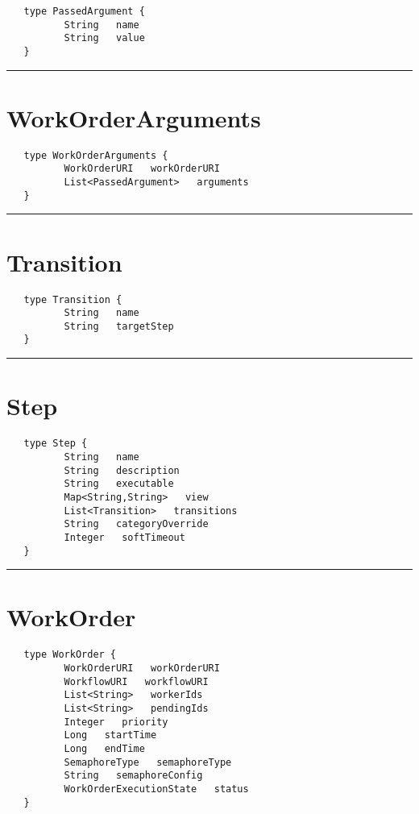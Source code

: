 \begin{verbatim}
   type PassedArgument {
          String   name
          String   value
   }
\end{verbatim}

\rule{12cm}{2pt}
\section{WorkOrderArguments}
\label{type:WorkOrderArguments}

\begin{verbatim}
   type WorkOrderArguments {
          WorkOrderURI   workOrderURI
          List<PassedArgument>   arguments
   }
\end{verbatim}

\rule{12cm}{2pt}
\section{Transition}
\label{type:Transition}

\begin{verbatim}
   type Transition {
          String   name
          String   targetStep
   }
\end{verbatim}

\rule{12cm}{2pt}
\section{Step}
\label{type:Step}

\begin{verbatim}
   type Step {
          String   name
          String   description
          String   executable
          Map<String,String>   view
          List<Transition>   transitions
          String   categoryOverride
          Integer   softTimeout
   }
\end{verbatim}

\rule{12cm}{2pt}
\section{WorkOrder}
\label{type:WorkOrder}

\begin{verbatim}
   type WorkOrder {
          WorkOrderURI   workOrderURI
          WorkflowURI   workflowURI
          List<String>   workerIds
          List<String>   pendingIds
          Integer   priority
          Long   startTime
          Long   endTime
          SemaphoreType   semaphoreType
          String   semaphoreConfig
          WorkOrderExecutionState   status
   }
\end{verbatim}

